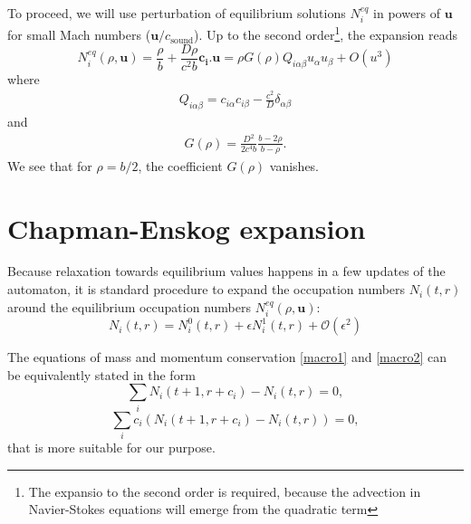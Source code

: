 To proceed, we will use perturbation of equilibrium solutions $N_i^{eq}$ in powers of $\bm{u}$ for small Mach numbers ($\bm{u}/c_{\mathrm{sound}}$). 
Up to the second order\footnote{The expansio to the second order is required, because the advection in Navier-Stokes equations will emerge from the quadratic term}, the expansion reads \cite{frisch}
\begin{equation} \label{eou}
N_i^{eq}(\rho,\bm{u}) = \frac{\rho}{b} + \frac{D\rho}{c^2 b}\bm{c_i}.\bm{u} = \rho G(\rho) Q_{i\alpha\beta}u_{\alpha}u_{\beta} + O(u^3)
\end{equation}
where 
\begin{align}
Q_{i\alpha\beta} = c_{i\alpha} c_{i\beta} - \frac{c^2}{D} \delta_{\alpha\beta}
\end{align}
and
\begin{align}
G(\rho) = \frac{D^2}{2c^4b}\frac{b-2\rho}{b-\rho}.
\end{align}
We see that for $\rho= b/2$, the coefficient $G(\rho)$ vanishes.

\section{Chapman-Enskog expansion}
Because relaxation towards equilibrium values happens in a few updates of the automaton, it is standard procedure to expand the occupation numbers $N_i(t,r)$ around the equilibrium occupation numbers $N_i^{eq}(\rho,\bm{u})$:
\begin{equation} \label{chap}
N_i(t,r) = N_i^0(t,r) + \epsilon N_i^1(t,r) + \mathcal{O}(\epsilon^2) 
\end{equation} 


The equations of mass and momentum conservation \ref{macro1} and \ref{macro2} can be equivalently stated in the form
\begin{equation} \label{macro_m}
\sum_i N_i(t+1,r+c_i) - N_i(t,r) = 0 ,
\end{equation}
\begin{equation} \label{macro_p}
\sum_i c_i (N_i(t+1,r+c_i) - N_i(t,r)) = 0,
\end{equation}
that is more suitable for our purpose.

